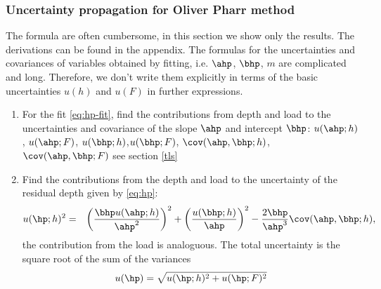 
\subsubsection{Uncertainty propagation for Oliver Pharr method} \label{op_unc}
The formula are often cumbersome, in this section we show only the results. The derivations can be found in the appendix. 
The formulas for the uncertainties and covariances of variables obtained by fitting, i.e. $\ahp$, $\bhp$, $m$ are complicated and long. 
Therefore, we don't write them explicitly in terms of the basic uncertainties $u(h)$ and $u(F)$ in further expressions. 
\begin{enumerate}
 \item \label{op_unc_hpfit}
 For the fit \eqref{eq:hp-fit}, find the contributions from depth and load to the uncertainties and covariance of the slope $\ahp$ and intercept $\bhp$: $u(\ahp; h)$, $u(\ahp; F)$, $u(\bhp; h)$,$u(\bhp; F)$, $\cov(\ahp, \bhp; h)$, $\cov(\ahp, \bhp; F)$ see section \ref{tls}
 \item \label{op_unc_hp} 
 Find the contributions from the depth and load to the uncertainty of the residual depth given by \eqref{eq:hp}: 
 \begin{eqnarray*}
 u(\hp; h)^2  &=&  \left( \frac{\bhp u(\ahp; h)}{\ahp^2} \right)^2 +\left(\frac{u(\bhp; h)}{\ahp} \right)^2 - \frac{2\bhp}{\ahp^3} \cov(\ahp, \bhp; h), %
 \end{eqnarray*}
the contribution from the load is analoguous. The total uncertainty is the square root of the sum of the variances
\begin{equation}
 u(\hp) = \sqrt{u(\hp; h)^2 + u(\hp; F)^2}
 \end{equation}


\end{enumerate}
